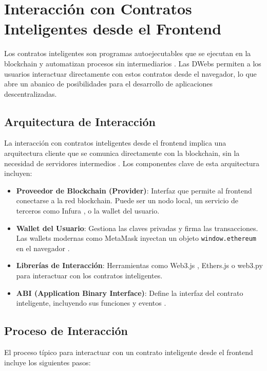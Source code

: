 \section{Interacción con Contratos Inteligentes desde el Frontend}

Los contratos inteligentes son programas autoejecutables que se ejecutan en la blockchain y automatizan procesos sin intermediarios \cite{buterin2014next}. Las DWebs permiten a los usuarios interactuar directamente con estos contratos desde el navegador, lo que abre un abanico de posibilidades para el desarrollo de aplicaciones descentralizadas.

\subsection{Arquitectura de Interacción}

La interacción con contratos inteligentes desde el frontend implica una arquitectura cliente que se comunica directamente con la blockchain, sin la necesidad de servidores intermedios \cite{mavridou2018tool}. Los componentes clave de esta arquitectura incluyen:

\begin{itemize}
    \item \textbf{Proveedor de Blockchain (Provider)}: Interfaz que permite al frontend conectarse a la red blockchain. Puede ser un nodo local, un servicio de terceros como Infura \cite{infura}, o la wallet del usuario.
    \item \textbf{Wallet del Usuario}: Gestiona las claves privadas y firma las transacciones. Las wallets modernas como MetaMask inyectan un objeto \texttt{window.ethereum} en el navegador \cite{metamaskdocs}.
    \item \textbf{Librerías de Interacción}: Herramientas como Web3.js \cite{web3js}, Ethers.js \cite{ethersjs} o web3.py para interactuar con los contratos inteligentes.
    \item \textbf{ABI (Application Binary Interface)}: Define la interfaz del contrato inteligente, incluyendo sus funciones y eventos \cite{soliditydocs}.
\end{itemize}

\subsection{Proceso de Interacción}

El proceso típico para interactuar con un contrato inteligente desde el frontend incluye los siguientes pasos:

